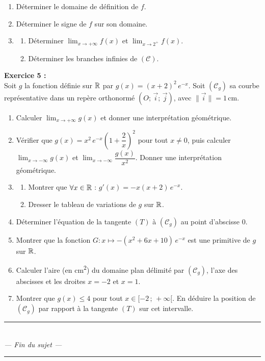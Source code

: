 \begin{enumerate}[leftmargin=1.5em, label=\textbf{\arabic*.}, itemsep=2pt, topsep=4pt]
  \item D\'{e}terminer le domaine de d\'{e}finition de $f$.
  \item D\'{e}terminer le signe de $f$ sur son domaine.
  \item
    \begin{enumerate}[label=\textbf{\alph*.}, itemsep=1pt, topsep=1pt]
      \item D\'{e}terminer $\displaystyle\lim_{x \to +\infty} f(x)$
            et $\displaystyle\lim_{x \to 2^+} f(x)$.
      \item D\'{e}terminer les branches infinies de $(\mathcal{C})$.
    \end{enumerate}
\end{enumerate}

\newpage

\noindent\textbf{Exercice 5 :}\\
Soit $g$ la fonction d\'{e}finie sur $\mathbb{R}$ par $g(x) = (x+2)^2\,e^{-x}$.
Soit $(\mathcal{C}_g)$ sa courbe repr\'{e}sentative dans un rep\`{e}re
orthonorm\'{e} $(O;\,\vec{i};\,\vec{j})$, avec $\|\vec{i}\| = 1\,\text{cm}$.

\begin{enumerate}[leftmargin=1.5em, label=\textbf{\arabic*.}, itemsep=2pt, topsep=4pt]
  \item Calculer $\displaystyle\lim_{x \to +\infty} g(x)$ et donner une
        interpr\'{e}tation g\'{e}om\'{e}trique.
  \item V\'{e}rifier que $g(x) = x^2\,e^{-x}\!\left(1 + \dfrac{2}{x}\right)^2$
        pour tout $x \neq 0$, puis calculer $\displaystyle\lim_{x \to -\infty} g(x)$
        et $\displaystyle\lim_{x \to -\infty} \dfrac{g(x)}{x^2}$.
        Donner une interpr\'{e}tation g\'{e}om\'{e}trique.
  \item
    \begin{enumerate}[label=\textbf{\alph*.}, itemsep=1pt, topsep=1pt]
      \item Montrer que $\forall x \in \mathbb{R}$ :
            $g'(x) = -x(x+2)\,e^{-x}$.
      \item Dresser le tableau de variations de $g$ sur $\mathbb{R}$.
    \end{enumerate}
  \item D\'{e}terminer l'\'{e}quation de la tangente $(T)$ \`{a}
        $(\mathcal{C}_g)$ au point d'abscisse $0$.
  \item Montrer que la fonction $G : x \mapsto -(x^2 + 6x + 10)\,e^{-x}$
        est une primitive de $g$ sur $\mathbb{R}$.
  \item Calculer l'aire (en cm\textsuperscript{2}) du domaine plan d\'{e}limit\'{e}
        par $(\mathcal{C}_g)$, l'axe des abscisses et les droites
        $x = -2$ et $x = 1$.
  \item Montrer que $g(x) \leq 4$ pour tout $x \in [-2\,;\,+\infty[$.
        En d\'{e}duire la position de $(\mathcal{C}_g)$ par rapport
        \`{a} la tangente $(T)$ sur cet intervalle.
\end{enumerate}

\begin{center}
  \color{charcoal}\rule{5cm}{0.4pt}\\[3pt]
  \textit{--- Fin du sujet ---}\\
  \rule{5cm}{0.4pt}
\end{center}
